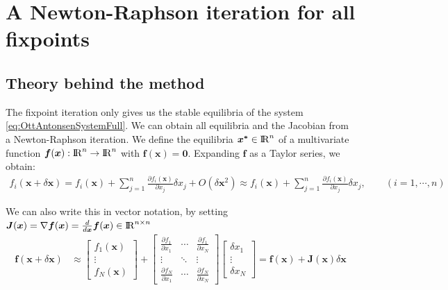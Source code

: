 \section{A Newton-Raphson iteration for all fixpoints}
\subsection{Theory behind the method}
The fixpoint iteration only gives us the stable equilibria of the system \eqref{eq:OttAntonsenSystemFull}. We can obtain all equilibria and the Jacobian from a Newton-Raphson iteration. We define the equilibria $\boldsymbol{x^\ast} \in {\rm I\!R}^n$ of a multivariate function $\boldsymbol{f}(\boldsymbol{x}) : {\rm I\!R}^n \rightarrow {\rm I\!R}^n$ with $\boldsymbol{f}(\boldsymbol{x}) = \boldsymbol{0}$. Expanding $\boldsymbol{f}$ as a Taylor series, we obtain:
\begin{align}
f_i(\boldsymbol{x} + \delta \boldsymbol{x}) =f_{i}(\boldsymbol{x}) + \sum_{j=1}^{n} \frac{\partial f_{i}(\boldsymbol{x})}{\partial x_{j}} \delta x_{j}+O\left(\delta \boldsymbol{x}^{2}\right) \approx f_{i}(\boldsymbol{x})+\sum_{j=1}^{n} \frac{\partial f_{i}(\boldsymbol{x})}{\partial x_{j}} \delta x_{j}, \qquad (i=1, \cdots, n)
\end{align}

We can also write this in vector notation, by setting $\boldsymbol{J}(\boldsymbol{x}) = \nabla \boldsymbol{f}(\boldsymbol{x}) = \frac{d}{d\boldsymbol{x}} \boldsymbol{f}(\boldsymbol{x}) \in {\rm I\!R}^{n \times n}$ 
\begin{align}
\boldsymbol{f}(\boldsymbol{x}+\delta \boldsymbol{x}) &\approx\left[\begin{array}{c}f_{1}(\boldsymbol{x}) \\ \vdots \\ f_{N}(\boldsymbol{x})\end{array}\right] 
+ \left[\begin{array}{ccc}\frac{\partial f_{1}}{\partial x_{1}} & \cdots & \frac{\partial f_{1}}{\partial x_{N}} \\ \vdots & \ddots & \vdots \\ \frac{\partial f_{N}}{\partial x_{1}} & \cdots & \frac{\partial f_{N}}{\partial x_{N}}\end{array}\right]
\left[\begin{array}{c}\delta x_{1} \\ \vdots \\ \delta x_{N}\end{array}\right] 
=\boldsymbol{f}(\boldsymbol{x})+\boldsymbol{J}(\boldsymbol{x}) \delta \boldsymbol{x} 
\end{align}

